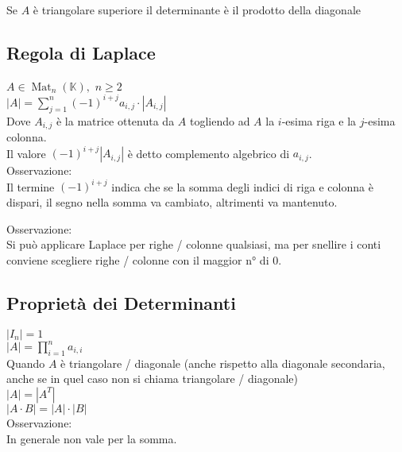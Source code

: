 \documentclass[a4paper, twoside, italian, 11pt]{book}
\newcommand{\detm}[1] {\left | #1 \right |}
\DeclareMathOperator{\Mat}{Mat}
\newcommand{\K}{\mathbb K}
\begin{document}
\noindent
Se $A$ è triangolare superiore il determinante è il prodotto della diagonale


\subsection{Regola di Laplace}

$A \in \Mat_n(\K),$ $n \geq 2$ \\

\noindent
$\detm A = \sum\limits_{j=1}^{n} (-1)^{i+j} a_{i,j} \cdot \detm{A_{i,j}} $ \\

\noindent
Dove $A_{i,j}$ è la matrice ottenuta da $A$ togliendo ad $A$ la $i$-esima riga e la $j$-esima colonna. \\

\noindent
Il valore $(-1)^{i+j} \detm{A_{i,j}}$ è detto complemento algebrico di $a_{i,j}$. \\

\noindent
Osservazione: \\
Il termine $(-1)^{i+j}$ indica che se la somma degli indici di riga e colonna è dispari, il segno nella somma va cambiato, altrimenti va mantenuto.

\noindent
Osservazione: \\
Si può applicare Laplace per righe / colonne qualsiasi, ma per snellire i conti conviene scegliere righe / colonne con il maggior n° di $0$.


\subsection{Proprietà dei Determinanti}

$\detm{I_n} = 1$ \\

\noindent
$\detm A = \prod_{i=1}^n a_{i,i}$ \\

\noindent
Quando $A$ è triangolare / diagonale (anche rispetto alla diagonale secondaria, anche se in quel caso non si chiama triangolare / diagonale) \\

\noindent
$\detm A = \detm{A^T}$ \\

\noindent
$\detm{A \cdot B} = \detm A \cdot \detm B$ \\

\noindent
Osservazione: \\
In generale non vale per la somma. \\
\end{document}
